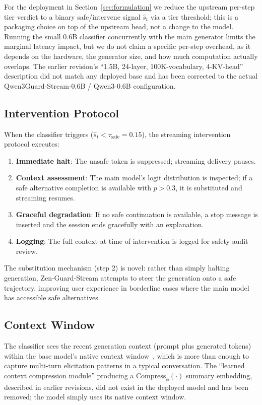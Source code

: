 \documentclass[11pt,a4paper]{article}
\begin{document}
For the deployment in Section~\ref{sec:formulation} we reduce the upstream per-step tier
verdict to a binary safe/intervene signal $\hat{s}_t$ via a tier threshold; this is a
packaging choice on top of the upstream head, not a change to the model. Running the small
0.6B classifier concurrently with the main generator limits the marginal latency impact, but
we do not claim a specific per-step overhead, as it depends on the hardware, the generator
size, and how much computation actually overlaps. The earlier revision's ``1.5B, 24-layer,
100K-vocabulary, 4-KV-head'' description did not match any deployed base and has been corrected
to the actual Qwen3Guard-Stream-0.6B / Qwen3-0.6B configuration.

\subsection{Intervention Protocol}

When the classifier triggers ($\hat{s}_t < \tau_{\text{safe}} = 0.15$), the streaming intervention protocol executes:

\begin{enumerate}
  \item \textbf{Immediate halt}: The unsafe token is suppressed; streaming delivery pauses.
  \item \textbf{Context assessment}: The main model's logit distribution is inspected; if a safe alternative completion is available with $p > 0.3$, it is substituted and streaming resumes.
  \item \textbf{Graceful degradation}: If no safe continuation is available, a stop message is inserted and the session ends gracefully with an explanation.
  \item \textbf{Logging}: The full context at time of intervention is logged for safety audit review.
\end{enumerate}

The substitution mechanism (step 2) is novel: rather than simply halting generation, Zen-Guard-Stream attempts to steer the generation onto a safe trajectory, improving user experience in borderline cases where the main model has accessible safe alternatives.

\subsection{Context Window}

The classifier sees the recent generation context (prompt plus generated tokens) within the
base model's native context window~\cite{qwen3guard}, which is more than enough to capture
multi-turn elicitation patterns in a typical conversation. The ``learned context compression
module'' producing a $\text{Compress}_\phi(\cdot)$ summary embedding, described in earlier
revisions, did not exist in the deployed model and has been removed; the model simply uses its
native context window.
\end{document}
